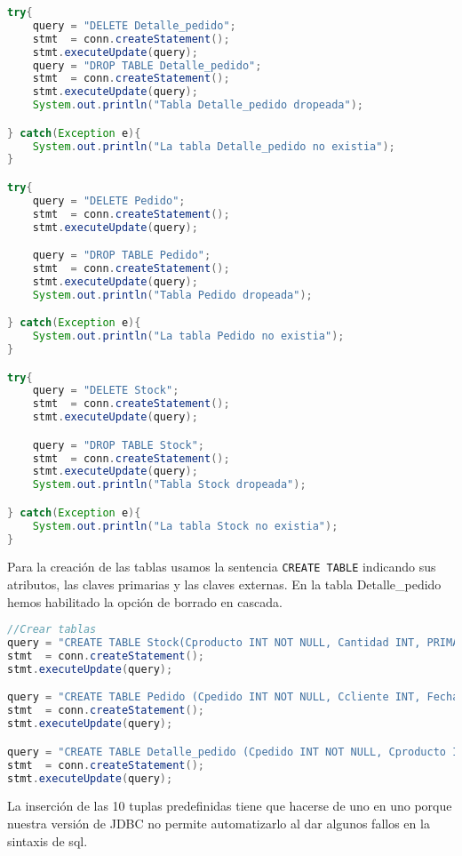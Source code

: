 \begin{lstlisting}[language=Java]
try{
	query = "DELETE Detalle_pedido";
	stmt  = conn.createStatement();
	stmt.executeUpdate(query);
	query = "DROP TABLE Detalle_pedido";
	stmt  = conn.createStatement();
	stmt.executeUpdate(query);
	System.out.println("Tabla Detalle_pedido dropeada");

} catch(Exception e){
	System.out.println("La tabla Detalle_pedido no existia");
}

try{
	query = "DELETE Pedido";
	stmt  = conn.createStatement();
	stmt.executeUpdate(query);

	query = "DROP TABLE Pedido";
	stmt  = conn.createStatement();
	stmt.executeUpdate(query);
	System.out.println("Tabla Pedido dropeada");

} catch(Exception e){
	System.out.println("La tabla Pedido no existia");
}

try{
	query = "DELETE Stock";
	stmt  = conn.createStatement();
	stmt.executeUpdate(query);

	query = "DROP TABLE Stock";
	stmt  = conn.createStatement();
	stmt.executeUpdate(query);
	System.out.println("Tabla Stock dropeada");

} catch(Exception e){
	System.out.println("La tabla Stock no existia");
}
\end{lstlisting}

Para la creación de las tablas usamos la sentencia \texttt{CREATE TABLE} indicando sus atributos, las claves primarias y las claves externas. En la tabla Detalle_pedido hemos habilitado la opción de borrado en cascada.

\begin{lstlisting}[language=Java]
//Crear tablas
query = "CREATE TABLE Stock(Cproducto INT NOT NULL, Cantidad INT, PRIMARY KEY (Cproducto))";
stmt  = conn.createStatement();
stmt.executeUpdate(query);

query = "CREATE TABLE Pedido (Cpedido INT NOT NULL, Ccliente INT, Fecha_pedido DATE, PRIMARY KEY (Cpedido))";
stmt  = conn.createStatement();
stmt.executeUpdate(query);

query = "CREATE TABLE Detalle_pedido (Cpedido INT NOT NULL, Cproducto INT NOT NULL, Cantidad int,FOREIGN KEY(Cpedido) REFERENCES Pedido(Cpedido) ON DELETE CASCADE,FOREIGN KEY(Cproducto) REFERENCES Stock(Cproducto) ON DELETE CASCADE,PRIMARY KEY(Cpedido,Cproducto))";
stmt  = conn.createStatement();
stmt.executeUpdate(query);
\end{lstlisting}

La inserción de las 10 tuplas predefinidas tiene que hacerse de uno en uno porque nuestra versión de JDBC no permite automatizarlo al dar algunos fallos en la sintaxis de sql.

